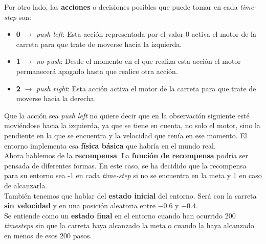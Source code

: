 \documentclass[11pt,fleqn]{book} %
\begin{document}
Por otro lado, las \textbf{acciones} o decisiones posibles que puede tomar en cada \textit{time-step} son: \\

\begin{itemize}
	\item \textbf{0} $\rightarrow$ \textit{push left}: Esta acción representada por el valor 0 activa el motor de la carreta para que trate de moverse hacia la izquierda. \\
	
	\item \textbf{1} $\rightarrow$ \textit{no push}: Desde el momento en el que realiza esta acción el motor permanecerá apagado hasta que realice otra acción. \\
	
	\item \textbf{2} $\rightarrow$ \textit{push right}: Esta acción activa el motor de la carreta para que trate de moverse hacia la derecha. \\	
\end{itemize}

Que la acción sea \textit{push left} no quiere decir que en la observación siguiente esté moviéndose hacia la izquierda, ya que se tiene en cuenta, no solo el motor, sino la pendiente en la que se encuentra y la velocidad que tenía en ese momento. El entorno implementa esa \textbf{física básica} que habría en el mundo real. \\

Ahora hablemos de la \textbf{recompensa}. La \textbf{función de recompensa} podría ser pensada de diferentes formas. En este caso, se ha decidido que la recompensa para su entorno sea -1 en cada \textit{time-step} si no se encuentra en la meta y 1 en caso de alcanzarla. \\

También tenemos que hablar del \textbf{estado inicial} del entorno. Será con la carreta \textbf{sin velocidad} y en una posición aleatoria entre $-0.6$ y $-0.4$.\\

Se entiende como un \textbf{estado final} en el entorno cuando han ocurrido 200 \textit{timesteps} sin que la carreta haya alcanzado la meta o cuando la haya alcanzado en menos de esos 200 pasos. \\

\end{document}
